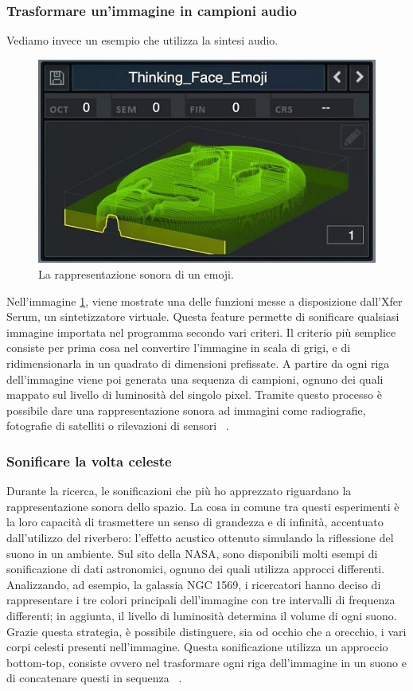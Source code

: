 \subsubsection{Trasformare un'immagine in campioni audio}
Vediamo invece un esempio che utilizza la sintesi audio.
\begin{figure}[H]
  \includegraphics[width=\linewidth]{img/wavetable_emoji.jpg}
  \caption{La rappresentazione sonora di un emoji.}
  \label{fig:emoji_wavetable}
\end{figure}

Nell'immagine \ref{fig:emoji_wavetable}, viene mostrate una delle funzioni messe a disposizione dall'Xfer Serum, un sintetizzatore virtuale.
Questa feature permette di sonificare qualsiasi immagine importata nel programma secondo vari criteri.
Il criterio più semplice consiste per prima cosa nel convertire l'immagine in scala di grigi, e di ridimensionarla in un quadrato di dimensioni prefissate.
A partire da ogni riga dell'immagine viene poi generata una sequenza di campioni, ognuno dei quali mappato sul livello di luminosità del singolo pixel.
Tramite questo processo è possibile dare una rappresentazione sonora ad immagini come radiografie, fotografie di satelliti o rilevazioni di sensori ~\cite{serum}.

\subsubsection{Sonificare la volta celeste}
Durante la ricerca, le sonificazioni che più ho apprezzato riguardano la rappresentazione sonora dello spazio.
La cosa in comune tra questi esperimenti è la loro capacità di trasmettere un senso di grandezza e di infinità, accentuato dall'utilizzo del riverbero: l'effetto acustico ottenuto simulando la riflessione del suono in un ambiente. 
Sul sito della NASA, sono disponibili molti esempi di sonificazione di dati astronomici, ognuno dei quali utilizza approcci differenti.
Analizzando, ad esempio, la galassia NGC 1569, i ricercatori hanno deciso di rappresentare i tre colori principali dell'immagine con tre intervalli di frequenza differenti; in aggiunta, il livello di luminosità determina il volume di ogni suono.
Grazie questa strategia, è possibile distinguere, sia od occhio che a orecchio, i vari corpi celesti presenti nell'immagine.
Questa sonificazione utilizza un approccio bottom-top, consiste ovvero nel trasformare ogni riga dell'immagine in un suono e di concatenare questi in sequenza ~\cite{nasa}. 

